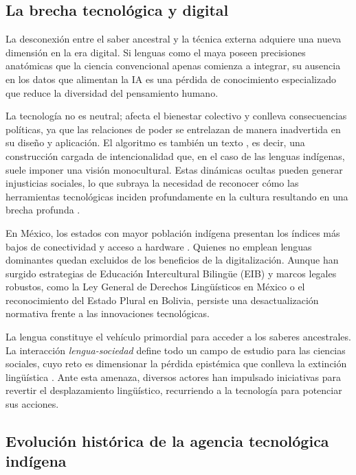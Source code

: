 \documentclass[spanish]{textolivre}
\begin{document}
\subsection{La brecha tecnológica y digital}

La desconexión entre el saber ancestral y la técnica externa adquiere una nueva dimensión en la era digital. Si lenguas como el maya poseen precisiones anatómicas que la ciencia convencional apenas comienza a integrar, su ausencia en los datos que alimentan la IA es una pérdida de conocimiento especializado que reduce la diversidad del pensamiento humano.

La tecnología no es neutral; afecta el bienestar colectivo y conlleva consecuencias políticas, ya que las relaciones de poder se entrelazan de manera inadvertida en su diseño y aplicación. El algoritmo es también un texto \cite{Araujo2025}, es decir, una construcción cargada de intencionalidad que, en el caso de las lenguas indígenas, suele imponer una visión monocultural. Estas dinámicas ocultas pueden generar injusticias sociales, lo que subraya la necesidad de reconocer cómo las herramientas tecnológicas inciden profundamente en la cultura resultando en una brecha profunda \cite{AlvarezAvila2016,Bielenberg1999}.

En México, los estados con mayor población indígena presentan los índices más bajos de conectividad y acceso a hardware \cite{INEGI2024}. Quienes no emplean lenguas dominantes quedan excluidos de los beneficios de la digitalización. Aunque han surgido estrategias de Educación Intercultural Bilingüe (EIB) y marcos legales robustos, como la Ley General de Derechos Lingüísticos en México o el reconocimiento del Estado Plural en Bolivia, persiste una desactualización normativa frente a las innovaciones tecnológicas.

La lengua constituye el vehículo primordial para acceder a los saberes ancestrales. La interacción \textit{lengua-sociedad} define todo un campo de estudio para las ciencias sociales, cuyo reto es dimensionar la pérdida epistémica que conlleva la extinción lingüística \cite{IbanezBlancas2020,RiosHernandez2010}. Ante esta amenaza, diversos actores han impulsado iniciativas para revertir el desplazamiento lingüístico, recurriendo a la tecnología para potenciar sus acciones.

\subsection{Evolución histórica de la agencia tecnológica indígena}
\end{document}
